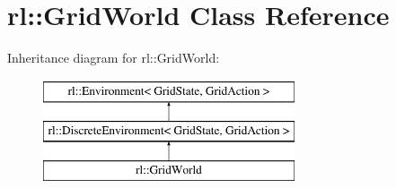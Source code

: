 \hypertarget{classrl_1_1_grid_world}{}\section{rl\+:\+:Grid\+World Class Reference}
\label{classrl_1_1_grid_world}
Inheritance diagram for rl\+:\+:Grid\+World\+:\begin{figure}[H]
\begin{center}
\leavevmode
\includegraphics[height=3.000000cm]{classrl_1_1_grid_world}
\end{center}
\end{figure}
